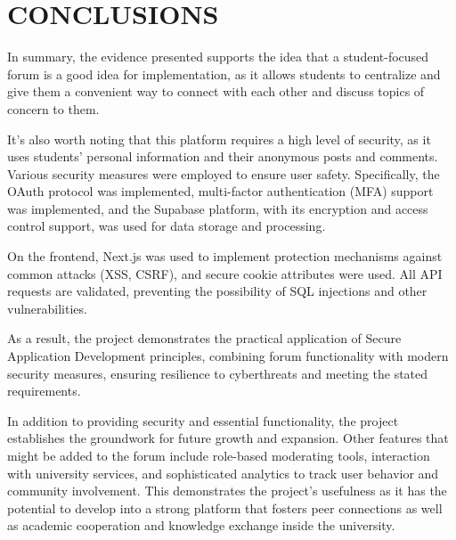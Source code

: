 \chapter*{CONCLUSIONS}

In summary, the evidence presented supports the idea that a student-focused forum is a good idea for implementation, as it allows students to centralize and give them a convenient way to connect with each other and discuss topics of concern to them.

It's also worth noting that this platform requires a high level of security, as it uses students' personal information and their anonymous posts and comments. Various security measures were employed to ensure user safety. Specifically, the OAuth protocol was implemented, multi-factor authentication (MFA) support was implemented, and the Supabase platform, with its encryption and access control support, was used for data storage and processing.

On the frontend, Next.js was used to implement protection mechanisms against common attacks (XSS, CSRF), and secure cookie attributes were used. All API requests are validated, preventing the possibility of SQL injections and other vulnerabilities.

As a result, the project demonstrates the practical application of Secure Application Development principles, combining forum functionality with modern security measures, ensuring resilience to cyberthreats and meeting the stated requirements.

In addition to providing security and essential functionality, the project establishes the groundwork for future growth and expansion.  Other features that might be added to the forum include role-based moderating tools, interaction with university services, and sophisticated analytics to track user behavior and community involvement.  This demonstrates the project's usefulness as it has the potential to develop into a strong platform that fosters peer connections as well as academic cooperation and knowledge exchange inside the university.